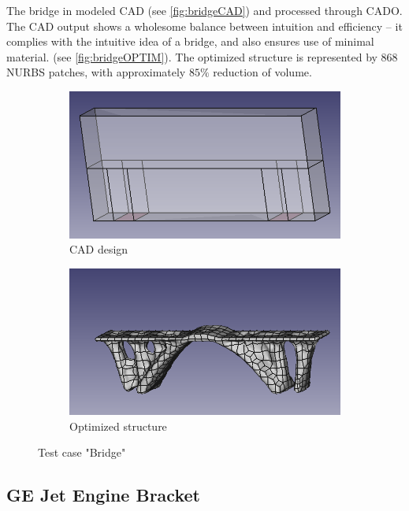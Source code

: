 The bridge in modeled CAD (see \autoref{fig:bridgeCAD}) and processed through CADO. The CAD output shows a wholesome balance between intuition and efficiency -- it complies with the intuitive idea of a bridge, and also ensures use of minimal material. (see \autoref{fig:bridgeOPTIM}). The optimized structure is represented by $868$ NURBS patches, with approximately $85\%$ reduction of volume.\enlargethispage{1cm}
\begin{figure}[H]
\begin{subfigure}[t]{.45\textwidth}
\begin{center}
\includegraphics[width=.9\textwidth]{Pictures/Results/BridgeIn.png}
\end{center}
\caption{CAD design}
\label{fig:bridgeCAD}
\end{subfigure}
\begin{subfigure}[t]{.45\textwidth}
\begin{center}
\includegraphics[width=.9\textwidth]{Pictures/Results/BridgeOut.png}
\end{center}
\caption{Optimized structure}
\label{fig:bridgeOPTIM}
\end{subfigure}
\caption{Test case "Bridge"}
\end{figure}

\subsection{GE Jet Engine Bracket}
\label{ssec:bracket}


